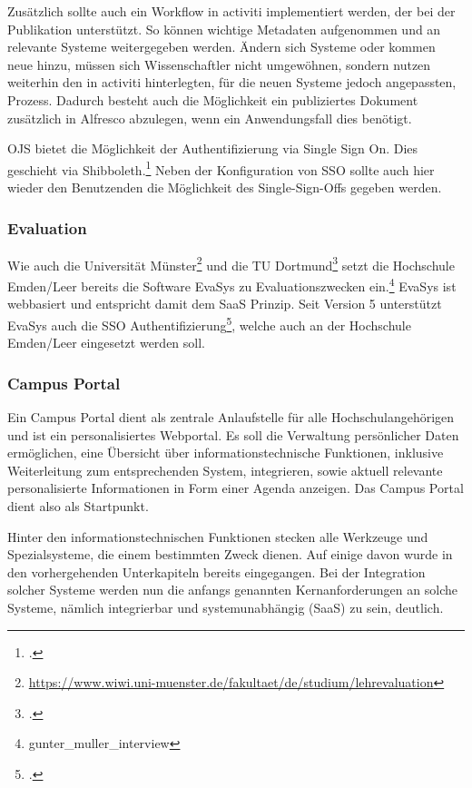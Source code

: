 {{Zusätzlich sollte auch ein Workflow in activiti implementiert werden, der bei der Publikation unterstützt. So können wichtige Metadaten aufgenommen und an relevante Systeme weitergegeben werden. Ändern sich Systeme oder kommen neue hinzu, müssen sich Wissenschaftler nicht umgewöhnen, sondern nutzen weiterhin den in activiti hinterlegten, für die neuen Systeme jedoch angepassten, Prozess. Dadurch besteht auch die Möglichkeit ein publiziertes Dokument zusätzlich in Alfresco abzulegen, wenn ein Anwendungsfall dies benötigt.

OJS bietet die Möglichkeit der Authentifizierung via Single Sign On. Dies geschieht via Shibboleth.\footcite{ojs_setup_sso} Neben der Konfiguration von SSO sollte auch hier wieder den Benutzenden die Möglichkeit des Single-Sign-Offs gegeben werden.

\subsubsection{Evaluation}
Wie auch die Universität Münster\footnote{\url{https://www.wiwi.uni-muenster.de/fakultaet/de/studium/lehrevaluation}} und die TU Dortmund\footcite{evasys_dortmund} setzt die Hochschule Emden/Leer bereits die Software EvaSys zu Evaluationszwecken ein.\footnote{gunter_muller_interview} EvaSys ist webbasiert und entspricht damit dem SaaS Prinzip.
Seit Version 5 unterstützt EvaSys auch die SSO Authentifizierung\footcite{evasys_sso}, welche auch an der Hochschule Emden/Leer eingesetzt werden soll.

\subsubsection{Campus Portal}
\label{subsubsection_campus_portal}
Ein Campus Portal dient als zentrale Anlaufstelle für alle Hochschulangehörigen und ist ein personalisiertes Webportal. Es soll die Verwaltung persönlicher Daten ermöglichen, eine Übersicht über informationstechnische Funktionen, inklusive Weiterleitung zum entsprechenden System, integrieren, sowie aktuell relevante personalisierte Informationen in Form einer Agenda anzeigen. Das Campus Portal dient also als Startpunkt.

Hinter den informationstechnischen Funktionen stecken alle Werkzeuge und Spezialsysteme, die einem bestimmten Zweck dienen. Auf einige davon wurde in den vorhergehenden Unterkapiteln bereits eingegangen. Bei der Integration solcher Systeme werden nun die anfangs genannten Kernanforderungen an solche Systeme, nämlich integrierbar und systemunabhängig (SaaS) zu sein, deutlich.

}}

